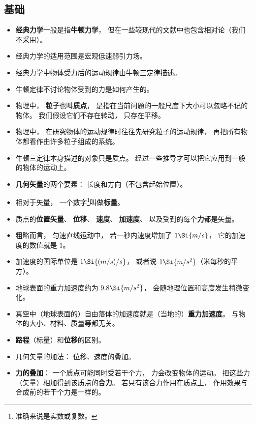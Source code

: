
\begin{issues}
\issueDraft
\end{issues}

\subsection{基础}
\begin{itemize}
\item \textbf{经典力学}一般是指\textbf{牛顿力学}， 但在一些较现代的文献中也包含相对论（我们不采用）。
\item 经典力学的适用范围是宏观低速弱引力场。
\item 经典力学中物体受力后的运动规律由牛顿三定律描述。
\item 牛顿定律不讨论物体受到的力是如何产生的。
\item 物理中， \textbf{粒子}也叫\textbf{质点}， 是指在当前问题的一般尺度下大小可以忽略不记的物体。 我们假设它们不存在转动， 只存在平移。
\item 物理中， 在研究物体的运动规律时往往先研究粒子的运动规律， 再把所有物体都看作由许多粒子组成的系统。
\item 牛顿三定律本身描述的对象只是质点。 经过一些推导才可以把它应用到一般的物体的运动上。
\item \textbf{几何矢量}的两个要素： 长度和方向（不包含起始位置）。
\item 相对于矢量， 一个数字\footnote{准确来说是实数或复数。}叫做\textbf{标量}。
\item 质点的\textbf{位置矢量}、 \textbf{位移}、 \textbf{速度}、 \textbf{加速度}、 以及受到的每个\textbf{力}都是矢量。
\item 粗略而言， 匀速直线运动中， 若一秒内速度增加了 $1\Si{m/s}$， 它的加速度的数值就是 $1$。
\item 加速度的国际单位是 $1\Si{(m/s)/s}$， 或者说 $1\Si{m/s^2}$（米每秒的平方）。
\item 地球表面的重力加速度约为 $9.8\Si{m/s^2}$， 会随地理位置和高度发生稍微变化。
\item 真空中（地球表面的）自由落体的加速度就是（当地的）\textbf{重力加速度}。 与物体的大小、材料、质量等都无关。
\item \textbf{路程}（标量）和\textbf{位移}的区别。
\item 几何矢量的加法： 位移、速度的叠加。
\item \textbf{力的叠加}： 一个质点可能同时受若干个力， 力会改变物体的运动。 把这些力（矢量）相加得到该质点的\textbf{合力}。 若只有该合力作用在质点上， 作用效果与合成前的若干个力是一样的。

\end{itemize}

